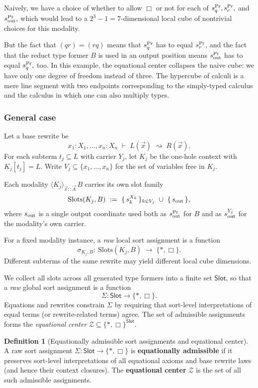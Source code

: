 \documentclass[11pt]{article}
\theoremstyle{definition}
\newtheorem{definition}{Definition}[section]
\theoremstyle{plain}
\theoremstyle{remark}
\theoremstyle{plain}
\newcommand{\angles}[3]{\langle #1 \rangle_{#2}\,#3}
\newcommand{\Slots}{\mathrm{Slots}}
\newcommand{\Boxsort}{\Box}
\newcommand{\astsort}{\ast}
\renewcommand{\Pr}{{\rm Pr}}
\newcommand{\rsq}{\rightsquigarrow}
\begin{document}
Naively, we have a choice of whether to allow $\Boxsort$ or not for each of $s_q^\Pr, s_r^\Pr,$ and $s_{\rm out}^\Pr,$ which would lead to a $2^3-1=7$-dimensional local cube of nontrivial choices for this modality.

But the fact that $(qr) = (rq)$ means that $s_q^\Pr$ has to equal $s_r^\Pr$, and the fact that the reduct type former $B$ is used in an output position means $s_{\rm out}^\Pr$ has to equal $s_q^\Pr,$ too.  In this example, the equational center collapses the naive cube: we have only one degree of freedom instead of three. The hypercube of calculi is a mere line segment with two endpoints corresponding to the simply-typed calculus and the calculus in which one can also multiply types.

\subsubsection{General case}

Let a base rewrite be
\[
  x_1:X_1,\dots,x_n:X_n \;\vdash\; L(\vec x) \;\rsq\; R(\vec x).
\]
For each subterm $t_j \subseteq L$ with carrier $Y_j$, let $K_j$ be the one-hole context with $K_j[t_j]=L$.
Write $V_j\subseteq\{x_1,\dots,x_n\}$ for the set of variables free in $K_j$.

Each modality $\angles{K_j}{\vec{x}::\vec{A}}{B}$ carries its own slot family
\[
  \Slots(K_j,B)\ :=\ \{\,s_k^{X_k}\,\}_{k\in V_j}\ \cup\ \{\,s_{\rm out}\,\},
\]
where $s_{\rm out}$ is a single output coordinate used both as $s_{\rm out}^{\Pr}$ for $B$ and as $s_{\rm out}^{Y_j}$ for the modality's own carrier.

For a fixed modality instance, a \emph{raw} local sort assignment is a function
\[
  \sigma_{K_j,B}:\ \Slots(K_j,B) \;\longrightarrow\; \{\astsort,\Boxsort\}.
\]
Different subterms of the same rewrite may yield different local cube dimensions.

We collect all slots across all generated type formers into a finite set $\mathsf{Slot}$, so that a \emph{raw} global sort assignment is a function
\[
  \Sigma : \mathsf{Slot} \longrightarrow \{\astsort,\Boxsort\}.
\]
Equations and rewrites constrain $\Sigma$ by requiring that sort-level interpretations of equal terms (or rewrite-related terms) agree. The set of admissible assignments forms the \emph{equational center} $\mathcal{Z}\subseteq \{\astsort,\Boxsort\}^{\mathsf{Slot}}$.

\begin{definition}[Equationally admissible sort assignments and equational center]
  A raw sort assignment $\Sigma : \mathsf{Slot}\to\{\astsort,\Boxsort\}$ is \textbf{equationally admissible} if it preserves sort-level interpretations of all equational axioms and base rewrite laws (and hence their context closures).  The \textbf{equational center} $\mathcal{Z}$ is the set of all such admissible assignments.
\end{definition}
\end{document}
